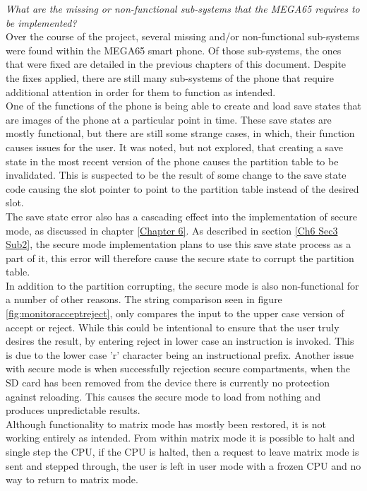 \textit{What are the missing or non-functional sub-systems that the MEGA65 requires to be implemented?}\\
Over the course of the project, several missing and/or non-functional sub-systems were found within the MEGA65 smart phone. 
Of those sub-systems, the ones that were fixed are detailed in the previous chapters  of this document. 
Despite the fixes applied, there are still many sub-systems of the phone that require additional attention in order for them to function as intended.\\
One of the functions of the phone is being able to create and load save states that are images of the phone at a particular point in time. 
These save states are mostly functional, but there are still some strange cases, in which, their function causes issues for the user. 
It was noted, but not explored, that creating a save state in the most recent version of the phone causes the partition table to be invalidated. 
This is suspected to be the result of some change to the save state code causing the slot pointer to point to the partition table instead of the desired slot.\\
The save state error also has a cascading effect into the implementation of secure mode, as discussed in chapter \ref{Chapter 6}. 
As described in section \ref{Ch6 Sec3 Sub2}, the secure mode implementation plans to use this save state process as a part of it, this error will therefore cause the secure state to corrupt the partition table.\\
In addition to the partition corrupting, the secure mode is also non-functional for a number of other reasons. 
The string comparison seen in figure \ref{fig:monitoracceptreject}, only compares the input to the upper case version of accept or reject. 
While this could be intentional to ensure that the user truly desires the result, by entering reject in lower case an instruction is invoked. 
This is due to the lower case 'r' character being an instructional prefix. 
Another issue with secure mode is when successfully rejection secure compartments, when the SD card has been removed from the device there is currently no protection against reloading.
This causes the secure mode to load from nothing and produces unpredictable results.\\
Although functionality to matrix mode has mostly been restored, it is not working entirely as intended. 
From within matrix mode it is possible to halt and single step the CPU, if the CPU is halted, then a request to leave matrix mode is sent and stepped through, the user is left in user mode with a frozen CPU and no way to return to matrix mode.
